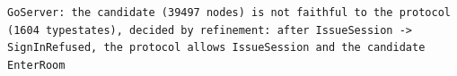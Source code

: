 \begin{lstlisting}[language={},basicstyle=\ttfamily\footnotesize,breaklines=true]
GoServer: the candidate (39497 nodes) is not faithful to the protocol (1604 typestates), decided by refinement: after IssueSession -> SignInRefused, the protocol allows IssueSession and the candidate EnterRoom
\end{lstlisting}
